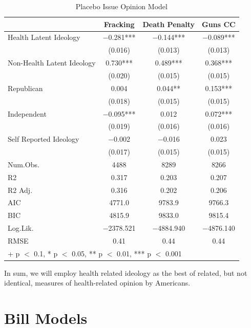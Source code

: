 \documentclass[
  oneside]{book}
\begin{document}
\begin{table}

\caption{\label{tab:unnamed-chunk-25}Placebo Issue Opinion Model}
\centering
\begin{tabular}[t]{lccc}
\toprule
  & Fracking & Death Penalty & Guns CC\\
\midrule
Health Latent Ideology & \num{-0.281}*** & \num{-0.144}*** & \num{-0.089}***\\
 & (\num{0.016}) & (\num{0.013}) & (\num{0.013})\\
Non-Health Latent Ideology & \num{0.730}*** & \num{0.489}*** & \num{0.368}***\\
 & (\num{0.020}) & (\num{0.015}) & (\num{0.015})\\
Republican & \num{0.004} & \num{0.044}** & \num{0.153}***\\
 & (\num{0.018}) & (\num{0.015}) & (\num{0.015})\\
Independent & \num{-0.095}*** & \num{0.012} & \num{0.072}***\\
 & (\num{0.019}) & (\num{0.016}) & (\num{0.016})\\
Self Reported Ideology & \num{-0.002} & \num{-0.016} & \num{0.023}\\
 & (\num{0.017}) & (\num{0.015}) & (\num{0.015})\\
\midrule
Num.Obs. & \num{4488} & \num{8289} & \num{8266}\\
R2 & \num{0.317} & \num{0.203} & \num{0.207}\\
R2 Adj. & \num{0.316} & \num{0.202} & \num{0.206}\\
AIC & \num{4771.0} & \num{9783.9} & \num{9766.3}\\
BIC & \num{4815.9} & \num{9833.0} & \num{9815.4}\\
Log.Lik. & \num{-2378.521} & \num{-4884.940} & \num{-4876.140}\\
RMSE & \num{0.41} & \num{0.44} & \num{0.44}\\
\bottomrule
\multicolumn{4}{l}{\rule{0pt}{1em}+ p $<$ 0.1, * p $<$ 0.05, ** p $<$ 0.01, *** p $<$ 0.001}\\
\end{tabular}
\end{table}

In sum, we will employ health related ideology as the best of related, but not identical, measures of health-related opinion by Americans.

\hypertarget{bill-models}{%
\chapter{Bill Models}\label{bill-models}}
\end{document}
